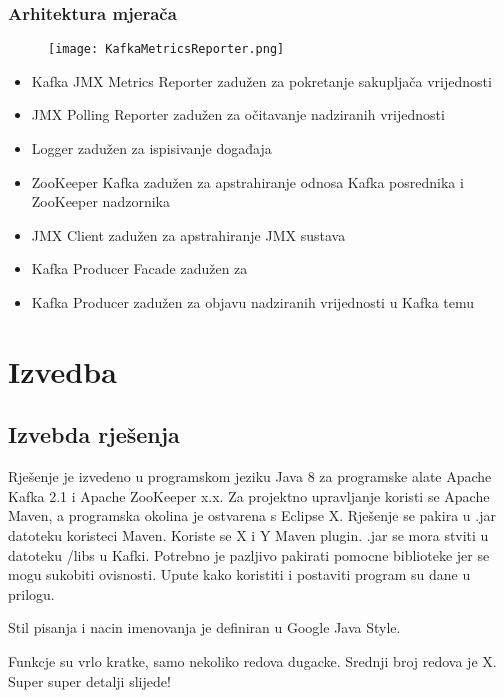 \documentclass[times, utf8, diplomski, numeric]{fer}
\begin{document}
\subsection{Arhitektura mjerača}

\begin{figure}[H]
    \centering
    \texttt{[image: KafkaMetricsReporter.png]}
    \caption{}
    \label{fig:kafka-metrics-reporter}
\end{figure}

\begin{itemize}
    \item Kafka JMX Metrics Reporter zadužen za pokretanje sakupljača vrijednosti
    \item JMX Polling Reporter zadužen za očitavanje nadziranih vrijednosti
    \item Logger zadužen za ispisivanje događaja
    \item ZooKeeper Kafka zadužen za apstrahiranje odnosa Kafka posrednika i ZooKeeper nadzornika
    \item JMX Client zadužen za apstrahiranje JMX sustava
    \item Kafka Producer Facade zadužen za 
    \item Kafka Producer zadužen za objavu nadziranih vrijednosti u Kafka temu
\end{itemize}

\chapter{Izvedba}

\section{Izvebda rješenja}

Rješenje je izvedeno u programskom jeziku Java 8 za programske alate Apache Kafka 2.1 i Apache ZooKeeper x.x. Za projektno upravljanje koristi se Apache Maven, a programska okolina je ostvarena s Eclipse X. Rješenje se pakira u .jar datoteku koristeci Maven. Koriste se X i Y Maven plugin.  .jar se mora stviti u datoteku /libs u Kafki. Potrebno je pazljivo pakirati pomocne biblioteke jer se mogu sukobiti ovisnosti. Upute kako koristiti i postaviti program su dane u prilogu.

Stil pisanja i nacin imenovanja je definiran u Google Java Style. 

Funkcje su vrlo kratke, samo nekoliko redova dugacke. Srednji broj redova je X. Super super detalji slijede!
\end{document}
